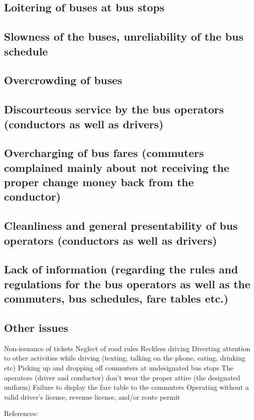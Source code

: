 \subsection{Loitering of buses at bus stops}

\subsection{Slowness of the buses, unreliability of the bus schedule}
\subsection{Overcrowding of buses}
\subsection{Discourteous service by the bus operators (conductors as well as drivers)}
\subsection{Overcharging of bus fares (commuters complained mainly about not receiving the proper change money back from the conductor)}
\subsection{Cleanliness and general presentability of bus operators (conductors as well as drivers)}
\subsection{Lack of information (regarding the rules and regulations for the bus operators as well as the commuters, bus schedules, fare tables etc.)}

\subsection{Other issues}
Non-issuance of tickets
Neglect of road rules
Reckless driving
Diverting attention to other activities while driving (texting, talking on the phone, eating, drinking etc)
Picking up and dropping off commuters at undesignated bus stops
The operators (driver and conductor) don't wear the proper attire (the designated uniform)
Failure to display the fare table to the commuters
Operating without a valid driver's license, revenue license, and/or route permit

References: \cite{Wickremasekara2012, Range2012}

